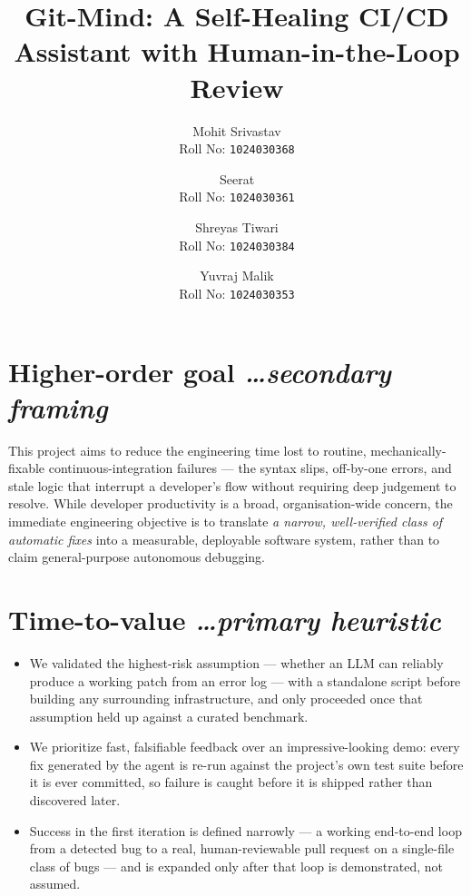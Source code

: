 \documentclass[11pt,a4paper]{article}
\title{Git-Mind: A Self-Healing CI/CD Assistant with Human-in-the-Loop Review}
\author{
  Mohit Srivastav\\ Roll No: \texttt{1024030368}
  \and
  Seerat\\ Roll No: \texttt{1024030361}
  \and
  Shreyas Tiwari\\ Roll No: \texttt{1024030384}
  \and
  Yuvraj Malik\\ Roll No: \texttt{1024030353}
}
\newcommand{\BvrHint}[1]{%
  {\normalfont\normalsize\itshape\hfill #1}}
\begin{document}
\maketitle

\section{Higher-order goal%
  \BvrHint{\ldots secondary framing}}
This project aims to reduce the engineering time lost to routine,
mechanically-fixable continuous-integration failures --- the syntax
slips, off-by-one errors, and stale logic that interrupt a
developer's flow without requiring deep judgement to resolve. While
developer productivity is a broad, organisation-wide concern, the
immediate engineering objective is to translate \emph{a narrow,
  well-verified class of automatic fixes} into a measurable,
deployable software system, rather than to claim general-purpose
autonomous debugging.

\section{Time-to-value %
\BvrHint{\ldots primary heuristic}}
\begin{itemize}[leftmargin=0.7cm]
    \item We validated the highest-risk assumption --- whether an
      LLM can reliably produce a working patch from an error log ---
      with a standalone script before building any surrounding
      infrastructure, and only proceeded once that assumption held
      up against a curated benchmark.
    \item We prioritize fast, falsifiable feedback over an
      impressive-looking demo: every fix generated by the agent is
      re-run against the project's own test suite before it is ever
      committed, so failure is caught before it is shipped rather
      than discovered later.
    \item Success in the first iteration is defined narrowly ---
      a working end-to-end loop from a detected bug to a real,
      human-reviewable pull request on a single-file class of bugs
      --- and is expanded only after that loop is demonstrated, not
      assumed.
\end{itemize}
\end{document}
